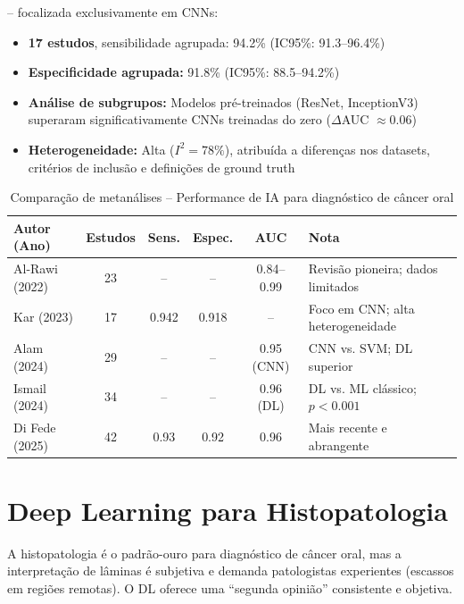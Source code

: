  -- focalizada exclusivamente em CNNs:
\begin{itemize}
  \item \textbf{17 estudos}, sensibilidade agrupada: 94.2\% (IC95\%: 91.3--96.4\%)
  \item \textbf{Especificidade agrupada:} 91.8\% (IC95\%: 88.5--94.2\%)
  \item \textbf{Análise de subgrupos:} Modelos pré-treinados (ResNet, InceptionV3)
        superaram significativamente CNNs treinadas do zero ($\Delta$AUC $\approx 0.06$)
  \item \textbf{Heterogeneidade:} Alta ($I^2 = 78\%$), atribuída a diferenças nos
        datasets, critérios de inclusão e definições de ground truth
\end{itemize}

\begin{table}[H]
  \centering
  \caption{Comparação de metanálises -- Performance de IA para diagnóstico de câncer oral}
  \label{tab:metanalises-cancer}
  \begin{tabularx}{\textwidth}{lccccX}
    \toprule
    \textbf{Autor (Ano)} & \textbf{Estudos} & \textbf{Sens.} & \textbf{Espec.} & \textbf{AUC} & \textbf{Nota} \\
    \midrule
    Al-Rawi (2022) & 23 & -- & -- & 0.84--0.99 & Revisão pioneira; dados limitados \\
    Kar (2023) & 17 & 0.942 & 0.918 & -- & Foco em CNN; alta heterogeneidade \\
    Alam (2024) & 29 & -- & -- & 0.95 (CNN) & CNN vs. SVM; DL superior \\
    Ismail (2024) & 34 & -- & -- & 0.96 (DL) & DL vs. ML clássico; $p < 0.001$ \\
    Di Fede (2025) & 42 & 0.93 & 0.92 & 0.96 & Mais recente e abrangente \\
    \bottomrule
  \end{tabularx}
\end{table}

\section{Deep Learning para Histopatologia}
\label{sec:histopatologia-dl}

A histopatologia é o padrão-ouro para diagnóstico de câncer oral, mas a
interpretação de lâminas é subjetiva e demanda patologistas experientes
(escassos em regiões remotas). O DL oferece uma ``segunda opinião'' consistente
e objetiva.

